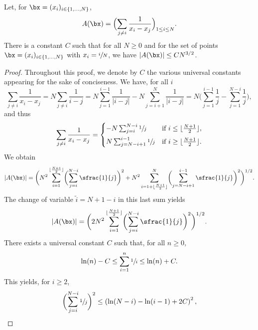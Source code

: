 \begin{lemma}\label{rho_0_unif}
Let, for $\bx=(x_i)_{i\in\{1,\dots,N\}}$,
\begin{align*}
A(\bx)=\Bigl(\sum_{j\neq i}\frac{1}{x_i-x_j}\Bigr)_{1\leq i\leq N}.
\end{align*}
There is a constant $C$ such that for all $N\geq0$ and for the set of points $\bx=(x_i)_{i\in\{1,\dots,N\}}$ with $x_i=\sfrac{i}{N}$, we have $|A(\bx)|\leq CN^{3/2}$.
\end{lemma}

\begin{proof}
Throughout this proof, we denote by $C$ the various universal constants appearing for the sake of conciseness. We have, for all $i$
\[
\sum_{j\neq i}\frac{1}{x_i-x_j}=N\sum_{j\neq i}\frac{1}{i-j}=N\sum_{j=1}^{i-1}\frac{1}{|i-j|}-N\sum_{j=i+1}^N\frac{1}{|i-j|}=N\biggl(\sum_{j=1}^{i-1}\frac{1}{j}-\sum_{j=1}^{N-i}\frac{1}{j}\biggr),
\]
and thus
\begin{align*}
\sum_{j\neq i}\frac{1}{x_i-x_j}=\begin{cases}
-N\sum_{j=i}^{N-i}\sfrac{1}{j}&\text{if }i\leq\lfloor\frac{N+1}{2}\rfloor,
\\[5pt]
N\sum_{j=N-i+1}^{i-1}\sfrac{1}{j}&\text{if }i\geq\lfloor\frac{N+1}{2}\rfloor.\end{cases}
\end{align*}
We obtain\vspace*{-5pt}
\begin{align*}
|A(\bx)|=\biggl(N^2\sum_{i=1}^{\lfloor\frac{N+1}{2}\rfloor}\biggl(\sum_{j=i}^{N-i}\sfrac{1}{j}\biggr)^2+N^2\sum_{i=1+\lfloor\frac{N+1}{2}\rfloor}^N\biggl(\sum_{j=N-i+1}^{i-1}\sfrac{1}{j}\biggr)^2\biggr)^{1/2}.
\end{align*}
The change of variable $\tilde{i}=N+1-i$ in this last sum yields\vspace*{-3pt}
\begin{align*}
|A(\bx)|=\biggl(2N^2\sum_{i=1}^{\lfloor\frac{N+1}{2}\rfloor}\biggl(\sum_{j=i}^{N-i}\sfrac{1}{j}\biggr)^2\biggr)^{1/2}.
\end{align*}
There exists a universal constant $C$ such that, for all $n\geq0$,\vspace*{-3pt}
\begin{align*}
\ln(n)-C\leq\sum_{i=1}^n\sfrac{1}{i}\leq \ln(n)+C.
\end{align*}
This yields, for $i\geq2$,\vspace*{-5pt}
\begin{align*}
\biggl(\sum_{j=i}^{N-i}\sfrac{1}{j}\biggr)^2\leq\left(\ln(N-i)-\ln(i-1)+2C\right)^2,

\end{align*}
\end{proof}
